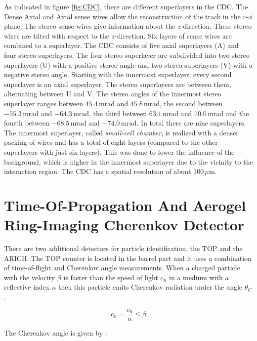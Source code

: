 \documentclass[a4paper,11pt,twosided,final,german,openbib,pdftex,listof=totoc,bibliography=totoc]{scrbook}
\begin{document}
As indicated in figure \ref{fig:CDC}, there are different superlayers in the CDC. The Dense Axial and Axial sense wires allow the reconstruction of the track in the $r$-$\phi$ plane. The stereo sense wires give information about the $z$-direction. These stereo wires are tilted with respect to the $z$-direction. Six layers of sense wires are combined to a superlayer. The CDC consists of five axial superlayers (A) and four stereo superlayers. The four stereo superlayer are subdivided into two stereo superlayers (U) with a positive stereo angle and two stereo superlayers (V) with a negative stereo angle. Starting with the innermost superlayer, every second superlayer is an axial superlayer. The stereo superlayers are between them, alternating between U and V. The stereo angles of the innermost stereo superlayer ranges between $45.4\,\textrm{mrad}$ and $45.8\,\textrm{mrad}$, the second between $-55.3\,\textrm{mrad}$ and $-64.3\,\textrm{mrad}$, the third between $63.1\,\textrm{mrad}$ and $70.0\,\textrm{mrad}$ and the fourth between $-68.5\,\textrm{mrad}$ and $-74.0\,\textrm{mrad}$. In total there are nine superlayers. The innermost superlayer, called \textit{small-cell chamber}, is realized with a denser packing of wires and has a total of eight layers (compared to the other superlayers with just six layers). This was done to lower the influence of the background, which is higher in the innermost superlayer due to the vicinity to the interaction region.
The CDC has a spatial resolution of about $100\,\mu\textrm{m}$.\cite{B2TR}

\section{Time-Of-Propagation And Aerogel Ring-Imaging Cherenkov Detector}
\label{sec:ARTO}

There are two additional detectors for particle identification, the TOP and the ARICH. The TOP counter is located in the barrel part and it uses a combination of time-of-flight and Cherenkov angle measurements.
When a charged particle with the velocity $\beta$ is faster than the speed of light $c_n$ in a medium with a reflective index $n$ then this particle emits Cherenkov radiation under the angle $\theta_{C} $.\cite{cerenkovAngle}


\begin{equation}
c_n = \frac{c_0}{n} \leq \beta	
\end{equation}

The Cherenkov angle is given by \cite{cerenkovAngle}:
\end{document}
